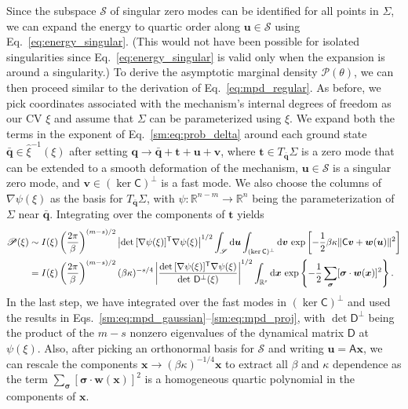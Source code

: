 Since the subspace $\mathscr{S}$ of singular zero modes can be identified for all points in $\Sigma$, we can expand the energy to quartic order along $\bm{u} \in \mathscr{S}$ using Eq.~\eqref{eq:energy_singular}.
(This would not have been possible for isolated singularities since Eq.~\eqref{eq:energy_singular} is valid only when the expansion is around a singularity.)
To derive the asymptotic marginal density $\mathscr{P}(\theta)$, we can then proceed similar to the derivation of Eq.~\eqref{eq:mpd_regular}.
As before, we pick coordinates associated with the mechanism's internal degrees of freedom as our CV $\xi$ and assume that $\Sigma$ can be parameterized using $\xi$.
We expand both the terms in the exponent of Eq.~\eqref{sm:eq:prob_delta} around each ground state $\bar{\bm{q}} \in \hat{\xi}^{-1}(\xi)$ after setting $\bm{q} \to \bar{\bm{q}} + \bm{t} + \bm{u} + \bm{v}$, where $\bm{t} \in T_{\bar{\bm{q}}}\Sigma$ is a zero mode that can be extended to a smooth deformation of the mechanism, $\bm{u} \in \mathscr{S}$ is a singular zero mode, and $\bm{v} \in (\ker\mathsf{C})^{\perp}$ is a fast mode.
We also choose the columns of $\nabla\psi(\xi)$ as the basis for $T_{\bar{\bm{q}}}\Sigma$, with $\psi: \mathbb{R}^{n-m} \to \mathbb{R}^{n}$ being the parameterization of $\Sigma$ near $\bar{\bm{q}}$.
Integrating over the components of $\bm{t}$ yields
%
\begin{equation}
  \begin{aligned}
    \mathscr{P}(\xi) &\sim I(\xi)\left(\frac{2\pi}{\beta}\right)^{(m - s)/2} \left|\det\,[\nabla\psi(\xi)]^\mathsf{T}\nabla\psi(\xi)\right|^{1/2} \int_{\mathscr{S}} \mathrm{d}\bm{u} \int_{(\ker\mathsf{C})^{\perp}} \mathrm{d}\bm{v}\, \exp\left[-\frac{1}{2}\beta\kappa\lVert\mathsf{C}\bm{v} + \bm{w}(\bm{u})\rVert^{2}\right]\\
                                 &= I(\xi)\left(\frac{2\pi}{\beta}\right)^{(m - s)/2}(\beta\kappa)^{-s/4} \left|\frac{\det\,[\nabla\psi(\xi)]^\mathsf{T}\nabla\psi(\xi)}{\det\,\mathsf{D}^{\perp}(\xi)}\right|^{1/2} \int_{\mathbb{R}^{s}} \mathrm{d}\bm{x}\, \exp\left\{-\frac{1}{2}\sum_{\bm{\sigma}}[\bm{\sigma}\cdot\bm{w}(\bm{x})]^{2}\right\}.
  \end{aligned}
  \label{sm:eq:mpd_perm}
\end{equation}
%
In the last step, we have integrated over the fast modes in $(\ker\mathsf{C})^{\perp}$ and used the results in Eqs.~\eqref{sm:eq:mpd_gaussian}--\eqref{sm:eq:mpd_proj}, with $\det\mathsf{D}^{\perp}$ being the product of the $m-s$ nonzero eigenvalues of the dynamical matrix $\mathsf{D}$ at $\psi(\xi)$.
Also, after picking an orthonormal basis for $\mathscr{S}$ and writing $\bm{u} = \mathsf{A}\bm{x}$, we can rescale the components $\bm{x} \to (\beta\kappa)^{-1/4}\bm{x}$ to extract all $\beta$ and $\kappa$ dependence as the term $\sum_{\bm{\sigma}} [\bm{\sigma}\cdot \bm{w}(\bm{x})]^{2}$ is a homogeneous quartic polynomial in the components of $\bm{x}$.
